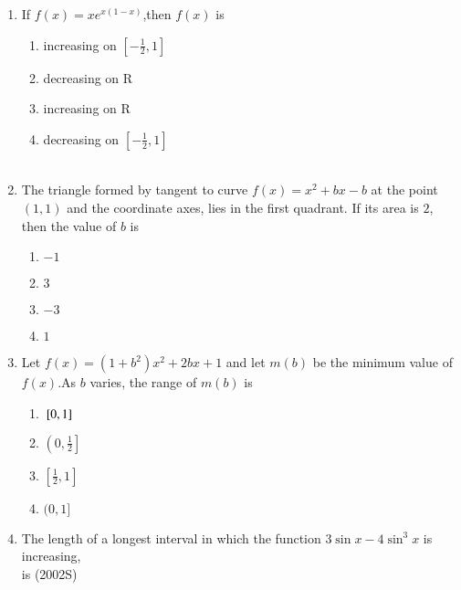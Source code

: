 \documentclass[journal]{IEEEtran}
\begin{document}
\begin{enumerate}[start=9]
\begin{enumerate}
\end{enumerate}
\item If $f(x)=xe^{x(1-x)}$,then $f(x)$ is 
\hfill {}
\begin{enumerate}
    \item increasing on $\left[-\displaystyle\frac{1}{2},1\right]$\\
    \item decreasing on R
    \item increasing on R
    \item decreasing on $\left[-\displaystyle\frac{1}{2},1\right]$\\\\
\end{enumerate}

\item The triangle formed by tangent to curve $f(x)=x^2+bx-b$ at the point $(1,1)$ and the coordinate axes, lies in the first quadrant. If its area is $2$, then the value of $b$ is 
\hfill {}
\begin{multicols}{4}
\begin{enumerate}
    \item $-1$
    \item $3$
    \item $-3$
    \item $1$\\
\end{enumerate}
\end{multicols}
\item Let $f(x)=(1+b^2)x^2+2bx+1$ and let $m(b)$ be the minimum value of $f(x)$.As $b$ varies, the range of $m(b)$ is 
\hfill {}
\begin{multicols}{4}
\begin{enumerate}
    \item ${}\left[0,1\right]$\\
    \item $\left(0,\displaystyle\frac{1}{2}\right]$\\
    \item $\left[\displaystyle\frac{1}{2},1\right]$\\
    \item $(0,1]$\\
\end{enumerate}
\end{multicols}
\item The length of a longest interval in which the function $3 \sin x-4\sin^3x$ is increasing,\\
is \hfill {(2002S)}

\end{enumerate}
\end{document}
